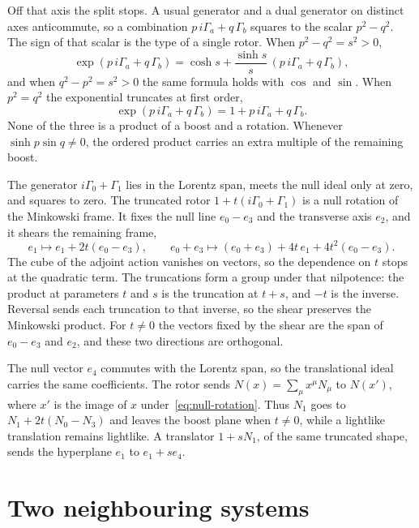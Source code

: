 \documentclass[a4paper]{article}
\begin{document}
Off that axis the split stops. A usual generator and a dual generator on distinct axes anticommute, so a combination \(p\,i\Gamma_a+q\,\Gamma_b\) squares to the scalar \(p^2-q^2\). The sign of that scalar is the type of a single rotor. When \(p^2-q^2=s^2>0\),
\[
\exp(p\,i\Gamma_a+q\,\Gamma_b)
  =\cosh s+\frac{\sinh s}{s}\,(p\,i\Gamma_a+q\,\Gamma_b),
\]
and when \(q^2-p^2=s^2>0\) the same formula holds with \(\cos\) and \(\sin\). When \(p^2=q^2\) the exponential truncates at first order,
\[
\exp(p\,i\Gamma_a+q\,\Gamma_b)
  =1+p\,i\Gamma_a+q\,\Gamma_b.
\]
None of the three is a product of a boost and a rotation. Whenever \(\sinh p\sin q\neq 0\), the ordered product carries an extra multiple of the remaining boost.

The generator \(i\Gamma_0+\Gamma_1\) lies in the Lorentz span, meets the null ideal only at zero, and squares to zero. The truncated rotor \(1+t(i\Gamma_0+\Gamma_1)\) is a null rotation of the Minkowski frame. It fixes the null line \(e_0-e_3\) and the transverse axis \(e_2\), and it shears the remaining frame,
\begin{equation}
e_1\mapsto e_1+2t(e_0-e_3),
\qquad
e_0+e_3\mapsto (e_0+e_3)+4t\,e_1+4t^2(e_0-e_3).
\label{eq:null-rotation}
\end{equation}
The cube of the adjoint action vanishes on vectors, so the dependence on \(t\) stops at the quadratic term. The truncations form a group under that nilpotence: the product at parameters \(t\) and \(s\) is the truncation at \(t+s\), and \(-t\) is the inverse. Reversal sends each truncation to that inverse, so the shear preserves the Minkowski product. For \(t\neq 0\) the vectors fixed by the shear are the span of \(e_0-e_3\) and \(e_2\), and these two directions are orthogonal.

The null vector \(e_4\) commutes with the Lorentz span, so the translational ideal carries the same coefficients. The rotor sends \(N(x)=\sum_\mu x^\mu N_\mu\) to \(N(x')\), where \(x'\) is the image of \(x\) under~\eqref{eq:null-rotation}. Thus \(N_1\) goes to \(N_1+2t(N_0-N_3)\) and leaves the boost plane when \(t\neq 0\), while a lightlike translation remains lightlike. A translator \(1+s N_1\), of the same truncated shape, sends the hyperplane \(e_1\) to \(e_1+s e_4\).

\section{Two neighbouring systems}
\end{document}
